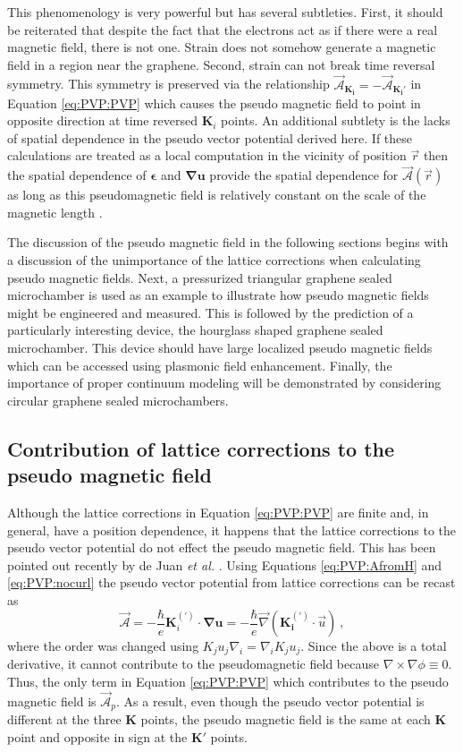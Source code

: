 This phenomenology is very powerful but has several subtleties.
First, it should be reiterated that despite the fact that the electrons act as if there were a real magnetic field, there is not one.
Strain does not somehow generate a magnetic field in a region near the graphene.
Second, strain can not break time reversal symmetry.
This symmetry is preserved via the relationship $\vec{\mathcal{A}}_{\bm{K_i}} = - \vec{\mathcal{A}}_{\bm{K_i'}}$ in Equation \ref{eq:PVP:PVP} which causes the pseudo magnetic field to point in opposite direction at time reversed $\bm{K}_i$ points.
An additional subtlety is the lacks of spatial dependence in the pseudo vector potential derived here.
If these calculations are treated as a local computation in the vicinity of position $\vec{r}$ then the spatial dependence of $\bm{\epsilon}$ and $\bm{\nabla u}$ provide the spatial dependence for $\vec{\mathcal{A}}(\vec{r})$ as long as this pseudomagnetic field is relatively constant on the scale of the magnetic length \cite{CastroNeto2009}.

The discussion of the pseudo magnetic field in the following sections begins with a discussion of the unimportance of the lattice corrections when calculating pseudo magnetic fields.
Next, a pressurized triangular graphene sealed microchamber \cite{Guinea2009} is used as an example to illustrate how pseudo magnetic fields might be engineered and measured.
This is followed by the prediction of a particularly interesting device, the hourglass shaped graphene sealed microchamber.
This device should have large localized pseudo magnetic fields which can be accessed using plasmonic field enhancement.
Finally, the importance of proper continuum modeling will be demonstrated by considering circular graphene sealed microchambers.

\subsection{Contribution of lattice corrections to the pseudo magnetic field}
Although the lattice corrections in Equation \ref{eq:PVP:PVP} are finite and, in general, have a position dependence, it happens that the lattice corrections to the pseudo vector potential do not effect the pseudo magnetic field.
This has been pointed out recently by de Juan \textit{et al.} \cite{DeJuan2013}. 
Using Equations \ref{eq:PVP:AfromH} and \ref{eq:PVP:nocurl} the pseudo vector potential from lattice corrections can be recast as 
\begin{equation*}
  \vec{\mathcal{A}}=-\frac{\hbar}{e} \bm{K}_i^{(')} \cdot \bm{\nabla u} 
  = - \frac{\hbar}{e} \vec{\nabla} \left( \bm{K_i^{(')}} \cdot \vec{u} \right) \ ,
\end{equation*}
where the order was changed using $K_j u_j \nabla_i=\nabla_i K_j u_j$.
Since the above is a total derivative, it cannot contribute to the pseudomagnetic field because $\nabla\times\nabla \phi \equiv 0$.
Thus, the only term in Equation \ref{eq:PVP:PVP} which contributes to the pseudo magnetic field is $\vec{\mathcal{A}}_p$.
As a result, even though the pseudo vector potential is different at the three $\bm{K}$ points, the pseudo magnetic field is the same at each $\bm{K}$ point and opposite in sign at the $\bm{K}'$ points.

